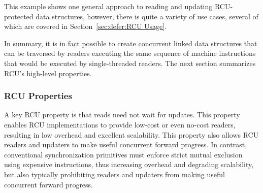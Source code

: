 This example shows one general approach to reading and updating
RCU-protected data structures, however, there is quite a variety
of use cases, several of which are covered in
Section~\ref{sec:defer:RCU Usage}.

In summary, it is in fact possible to create concurrent linked data
structures that can be traversed by readers executing the same sequence
of machine instructions that would be executed by single-threaded readers.
The next section summarizes RCU's high-level properties.

\fi

\subsubsection{RCU Properties}
\label{sec:defer:RCU Properties}

A key RCU property is that reads need not wait for updates.
This property enables RCU implementations to provide low-cost or even
no-cost readers, resulting in low overhead and excellent scalability.
This property also allows RCU readers and updaters to make useful
concurrent forward progress.
In contrast, conventional synchronization primitives must enforce strict
mutual exclusion using expensive instructions, thus increasing overhead
and degrading scalability, but also typically prohibiting readers and
updaters from making useful concurrent forward progress.

\QuickQuizEnd

